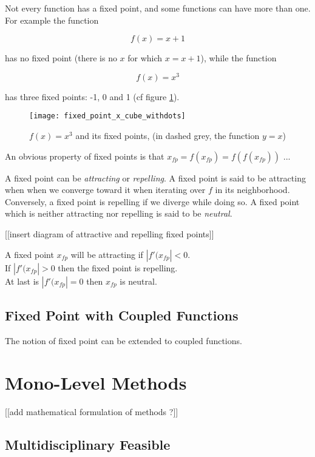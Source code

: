 Not every function has a fixed point, and some functions can have more than one. For example the function

$$f(x)=x+1$$

has no fixed point (there is no $x$ for which $x = x+1$), while the function

$$f(x) = x^3$$

has three fixed points: -1, 0 and 1 (cf figure \ref{fixed_points_x_3}).

\begin{figure}
\centering
\texttt{[image: fixed\_point\_x\_cube\_withdots]}
\caption{$f(x)=x^{3}$ and its fixed points, (in dashed grey, the function $y = x$)}
\label{fixed_points_x_3}
\end{figure}

An obvious property of fixed points is that $x_{fp} = f(x_{fp}) = f(f(x_{fp}))$ ...

A fixed point can be \emph{attracting} or \emph{repelling}. A fixed point is said to be attracting when when we converge toward it when iterating over $f$ in its neighborhood. Conversely, a fixed point is repelling if we diverge while doing so. A fixed point which is neither attracting nor repelling is said to be \emph{neutral}.

[[insert diagram of attractive and repelling fixed points]]

A fixed point $x_{fp}$ will be attracting if $|f'(x_{fp}| < 0$.\\
If $|f'(x_{fp}| > 0$ then the fixed point is repelling.\\
At last is $|f'(x_{fp}| = 0$ then $x_{fp}$ is neutral.


\subsection{Fixed Point with Coupled Functions}

The notion of fixed point can be extended to coupled functions.


\section{Mono-Level Methods}

[[add mathematical formulation of methods ?]]

\subsection{Multidisciplinary Feasible}


